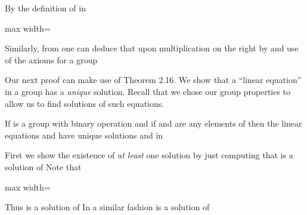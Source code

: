 \documentclass[11pt,oneside]{article}
\begin{document}
\BookNarrativetrue

\begin{BookBody}

\noindent By the definition of  in 

\begin{center}\begin{adjustbox}{max width=\linewidth}\end{adjustbox}\end{center}

\noindent Similarly, from  one can deduce that  upon multiplication on the right by  and use of the axioms for a group\BookEnd{\blacklozenge}

Our next proof can make use of Theorem 2.16. We show that a “linear equation” in a group has a\textit{ unique} solution. Recall that we chose our group properties to allow us to find solutions of such equations.

 If  is a group with binary operation \BookInline{\ast,\allowbreak } and if  and  are any elements of  then the linear equations  and  have unique solutions  and  in 

 First we show the existence of\textit{ at least} one solution by just computing that  is a solution of  Note that

\begin{center}\begin{adjustbox}{max width=\linewidth}\end{adjustbox}\end{center}

\noindent Thus  is a solution of  In a similar fashion is a solution of 


\end{BookBody}
\end{document}
